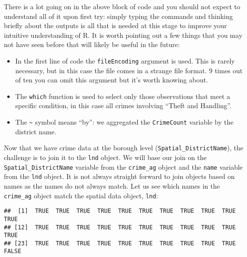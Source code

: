 \documentclass[]{article}
\newenvironment{Shaded}{}{}
\newcommand{\StringTok}[1]{\textcolor[rgb]{0.25,0.44,0.63}{{#1}}}
\newcommand{\CommentTok}[1]{\textcolor[rgb]{0.38,0.63,0.69}{\textit{{#1}}}}
\newcommand{\NormalTok}[1]{{#1}}
\begin{document}
There is a lot going on in the above block of code and you should not
expect to understand all of it upon first try: simply typing the
commands and thinking briefly about the outputs is all that is needed at
this stage to improve your intuitive understanding of R. It is worth
pointing out a few things that you may not have seen before that will
likely be useful in the future:

\begin{itemize}
\itemsep1pt\parskip0pt
\item
  In the first line of code the \texttt{fileEncoding} argument is used.
  This is rarely necessary, but in this case the file comes in a strange
  file format. 9 times out of ten you can omit this argument but it's
  worth knowing about.
\item
  The \texttt{which} function is used to select only those observations
  that meet a specific condition, in this case all crimes involving
  ``Theft and Handling''.
\item
  The \texttt{\textasciitilde{}} symbol means ``by'': we aggregated the
  \texttt{CrimeCount} variable by the district name.
\end{itemize}

Now that we have crime data at the borough level
(\texttt{Spatial\_DistrictName}), the challenge is to join it to the
\texttt{lnd} object. We will base our join on the
\texttt{Spatial\_DistrictName} variable from the \texttt{crime\_ag}
object and the \texttt{name} variable from the \texttt{lnd} object. It
is not always straight forward to join objects based on names as the
names do not always match. Let us see which names in the
\texttt{crime\_ag} object match the spatial data object, \texttt{lnd}:

\begin{Shaded}
\end{Shaded}

\begin{verbatim}
##  [1]  TRUE  TRUE  TRUE  TRUE  TRUE  TRUE  TRUE  TRUE  TRUE  TRUE  TRUE
## [12]  TRUE  TRUE  TRUE  TRUE  TRUE  TRUE  TRUE  TRUE  TRUE  TRUE  TRUE
## [23]  TRUE  TRUE  TRUE  TRUE  TRUE  TRUE  TRUE  TRUE  TRUE  TRUE FALSE
\end{verbatim}
\end{document}
